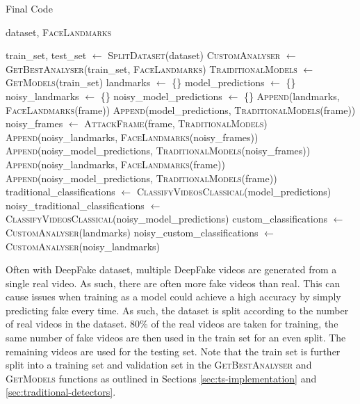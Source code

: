 \begin{algorithm}[h]
    \caption{Final Code}
    \label{alg:final-code}
    \begin{algorithmic}
        \Require dataset, \textsc{FaceLandmarks} 

        \State train\_set, test\_set $\gets$ \textsc{SplitDataset}(dataset)
        \State \textsc{CustomAnalyser} $\gets$ \textsc{GetBestAnalyser}(train\_set, \textsc{FaceLandmarks})
        \State \textsc{TraiditionalModels} $\gets$ \textsc{GetModels}(train\_set)
            \State landmarks $\gets$ \{\}
            \State model\_predictions $\gets$ \{\}
            \State noisy\_landmarks $\gets$ \{\}
            \State noisy\_model\_predictions $\gets$ \{\}
                \State \textsc{Append}(landmarks, \textsc{FaceLandmarks}(frame))
                \State \textsc{Append}(model\_predictions, \textsc{TraditionalModels}(frame))
                    \State noisy\_frames $\gets$ \textsc{AttackFrame}(frame, \textsc{TraditionalModels})
                    \State \textsc{Append}(noisy\_landmarks, \textsc{FaceLandmarks}(noisy\_frames))
                    \State \textsc{Append}(noisy\_model\_predictions, \textsc{TraditionalModels}(noisy\_frames))
                \Else
                    \State \textsc{Append}(noisy\_landmarks, \textsc{FaceLandmarks}(frame))
                    \State \textsc{Append}(noisy\_model\_predictions, \textsc{TraditionalModels}(frame))
                \EndIf
            \EndFor 
            \State traditional\_classifications $\gets$ \textsc{ClassifyVideosClassical}(model\_predictions)
            \State noisy\_traditional\_classifications $\gets$ \textsc{ClassifyVideosClassical}(noisy\_model\_predictions)
            \State custom\_classifications $\gets$ \textsc{CustomAnalyser}(landmarks)
            \State noisy\_custom\_classifications $\gets$ \textsc{CustomAnalyser}(noisy\_landmarks)
        \EndFor
    \end{algorithmic}
\end{algorithm}

Often with DeepFake dataset, multiple DeepFake videos are generated from a single real video. As such, there are often more fake videos than real. This can cause issues when training as a model could achieve a high accuracy by simply predicting fake every time. As such, the dataset is split according to the number of real videos in the dataset. 80\% of the real videos are taken for training, the same number of fake videos are then used in the train set for an even split. The remaining videos are used for the testing set. Note that the train set is further split into a training set and validation set in the \textsc{GetBestAnalyser} and \textsc{GetModels} functions as outlined in Sections \ref{sec:ts-implementation} and \ref{sec:traditional-detectors}.

